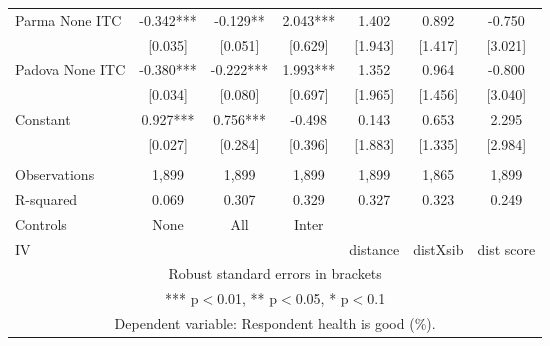 \begin{tabular}{lcccccc}
Parma None ITC & -0.342*** & -0.129** & 2.043*** & 1.402 & 0.892 & -0.750 \\
 & [0.035] & [0.051] & [0.629] & [1.943] & [1.417] & [3.021] \\
Padova None ITC & -0.380*** & -0.222*** & 1.993*** & 1.352 & 0.964 & -0.800 \\
 & [0.034] & [0.080] & [0.697] & [1.965] & [1.456] & [3.040] \\
Constant & 0.927*** & 0.756*** & -0.498 & 0.143 & 0.653 & 2.295 \\
 & [0.027] & [0.284] & [0.396] & [1.883] & [1.335] & [2.984] \\
 &  &  &  &  &  &  \\
Observations & 1,899 & 1,899 & 1,899 & 1,899 & 1,865 & 1,899 \\
R-squared & 0.069 & 0.307 & 0.329 & 0.327 & 0.323 & 0.249 \\
Controls & None & All & Inter &  &  &  \\
 IV &  &  &  & distance & distXsib & dist score \\ \hline
\multicolumn{7}{c}{ Robust standard errors in brackets} \\
\multicolumn{7}{c}{ *** p$<$0.01, ** p$<$0.05, * p$<$0.1} \\
\multicolumn{7}{c}{ Dependent variable: Respondent health is good (\%).} \\
\end{tabular}
